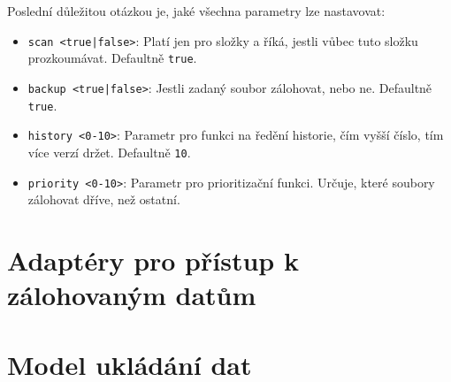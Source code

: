 \noindent Poslední důležitou otázkou je, jaké všechna parametry lze nastavovat:
\begin{itemize}
	\item {\tt scan <true|false>}: Platí jen pro složky a říká, jestli vůbec
	tuto složku prozkoumávat. Defaultně {\tt true}.
	\item {\tt backup <true|false>}: Jestli zadaný soubor zálohovat, nebo
	ne. Defaultně {\tt true}.
	\item {\tt history <0-10>}: Parametr pro funkci na ředění historie, čím
	vyšší číslo, tím více verzí držet. Defaultně {\tt 10}.
	\item {\tt priority <0-10>}: Parametr pro prioritizační funkci. Určuje,
	které soubory zálohovat dříve, než ostatní.
\end{itemize}

\section{Adaptéry pro přístup k zálohovaným datům}

\section{Model ukládání dat}

